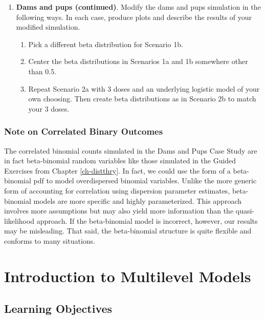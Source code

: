 \documentclass[
]{krantz}
\providecommand{\tightlist}{%
  \setlength{\itemsep}{0pt}\setlength{\parskip}{0pt}}
\begin{document}
\begin{enumerate}
\def\labelenumi{\arabic{enumi}.}
\setcounter{enumi}{1}
\item
  \textbf{Dams and pups (continued)}. Modify the dams and pups simulation in the following ways. In each case, produce plots and describe the results of your modified simulation.

  \begin{enumerate}
  \def\labelenumii{\alph{enumii}.}
  \tightlist
  \item
    Pick a different beta distribution for Scenario 1b.
  \item
    Center the beta distributions in Scenarios 1a and 1b somewhere other than 0.5.
  \item
    Repeat Scenario 2a with 3 doses and an underlying logistic model of your own choosing. Then create beta distributions as in Scenario 2b to match your 3 doses.
  \end{enumerate}
\end{enumerate}

\subsection{Note on Correlated Binary Outcomes}\label{note-on-correlated-binary-outcomes}

The correlated binomial counts simulated in the Dams and Pups Case Study are in fact beta-binomial random variables like those simulated in the Guided Exercises from Chapter \ref{ch-distthry}. In fact, we could use the form of a beta-binomial pdf to model overdispersed binomial variables. Unlike the more generic form of accounting for correlation using dispersion parameter estimates, beta-binomial models are more specific and highly parameterized. This approach involves more assumptions but may also yield more information than the quasi-likelihood approach. If the beta-binomial model is incorrect, however, our results may be misleading. That said, the beta-binomial structure is quite flexible and conforms to many situations.

\chapter{Introduction to Multilevel Models}\label{ch-multilevelintro}

\section{Learning Objectives}\label{learning-objectives-7}
\end{document}
